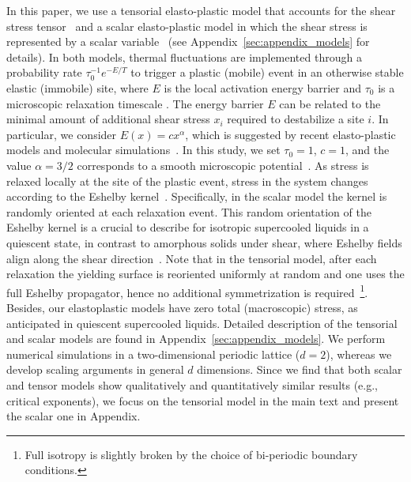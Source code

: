 \documentclass[pre,twocolumn,superscriptaddress,tightenlines,showpacs,longbibliography,floatfix,footinbib]{revtex4-1}
\newcommand{\MO}[1]{{\bf \color{red} $^{MO}$ #1}}
\begin{document}
In this paper, we use a tensorial elasto-plastic model that accounts for the shear stress tensor~\cite{jagla2020tensorial} and a scalar elasto-plastic model in which the shear stress is represented by a scalar variable~\cite{ozawa2023elasticity} (see Appendix~\ref{sec:appendix_models} for details). In both models, thermal fluctuations are implemented through a probability rate $\tau_0^{-1} e^{-E/T}$ to trigger a plastic (mobile) event in an otherwise stable elastic (immobile) site, where $E$ is the local activation energy barrier and $\tau_0$ is a microscopic relaxation timescale \cite{ferrero2014relaxation,popovic2021thermally,ferrero2021yielding,rodriguez2023temperature}. 
The energy barrier $E$ can be related to the minimal amount of additional shear stress $x_i$ required to destabilize a site $i$. In particular, we consider $E (x)= c x^{\alpha}$, which is suggested by recent elasto-plastic models and molecular simulations~\cite{ferrero2021yielding,popovic2021thermally,fan2014thermally,lerbinger2022relevance,rodriguez2023temperature}. In this study, we set $\tau_0=1$, $c=1$, and the value $\alpha=3/2$ corresponds to a smooth microscopic potential~\cite{aguirre2018critical}. 
As stress is relaxed locally at the site of the plastic event, stress in the system changes according to the Eshelby kernel~\cite{picard2004elastic}. Specifically, in the scalar model the kernel is randomly oriented at each relaxation event. This random orientation of the Eshelby kernel is a crucial to describe for isotropic supercooled liquids in a quiescent state, in contrast to amorphous solids under shear, where Eshelby fields align along the shear direction~\cite{maloney2006amorphous}.
Note that in the tensorial model, 
after each relaxation the yielding surface is reoriented uniformly at random and 
one uses the full Eshelby propagator, hence no additional symmetrization is required~\footnote{Full isotropy is slightly broken by the choice of bi-periodic boundary conditions.}.
Besides, our elastoplastic models have zero total (macroscopic) stress, as anticipated in quiescent supercooled liquids. Detailed description of the tensorial and scalar models are found in Appendix~\ref{sec:appendix_models}. We perform numerical simulations in a two-dimensional periodic lattice ($d=2$), whereas we develop scaling arguments in general $d$ dimensions. 
Since we find that both scalar and tensor models show qualitatively and quantitatively similar results (e.g., critical exponents), we focus on the tensorial model in the main text and present the scalar one in Appendix. 
\end{document}

